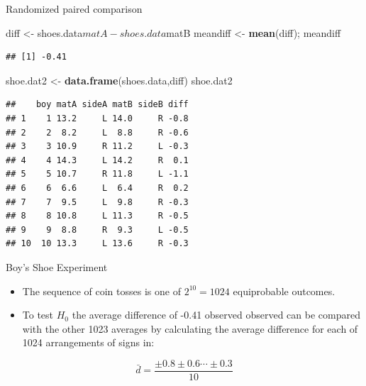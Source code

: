 \documentclass[9pt,ignorenonframetext,]{beamer}
\newenvironment{Shaded}{\begin{snugshade}}{\end{snugshade}}
\newcommand{\KeywordTok}[1]{\textcolor[rgb]{0.13,0.29,0.53}{\textbf{{#1}}}}
\newcommand{\StringTok}[1]{\textcolor[rgb]{0.31,0.60,0.02}{{#1}}}
\newcommand{\NormalTok}[1]{{#1}}
\begin{document}
\begin{frame}[fragile]{Randomized paired comparison}

\begin{Shaded}
\begin{Highlighting}[]
\NormalTok{diff <-}\StringTok{ }\NormalTok{shoes.data$matA-shoes.data$matB}
\NormalTok{meandiff <-}\StringTok{ }\KeywordTok{mean}\NormalTok{(diff); meandiff}
\end{Highlighting}
\end{Shaded}

\begin{verbatim}
## [1] -0.41
\end{verbatim}

\begin{Shaded}
\begin{Highlighting}[]
\NormalTok{shoe.dat2 <-}\StringTok{ }\KeywordTok{data.frame}\NormalTok{(shoes.data,diff)}
\NormalTok{shoe.dat2}
\end{Highlighting}
\end{Shaded}

\begin{verbatim}
##    boy matA sideA matB sideB diff
## 1    1 13.2     L 14.0     R -0.8
## 2    2  8.2     L  8.8     R -0.6
## 3    3 10.9     R 11.2     L -0.3
## 4    4 14.3     L 14.2     R  0.1
## 5    5 10.7     R 11.8     L -1.1
## 6    6  6.6     L  6.4     R  0.2
## 7    7  9.5     L  9.8     R -0.3
## 8    8 10.8     L 11.3     R -0.5
## 9    9  8.8     R  9.3     L -0.5
## 10  10 13.3     L 13.6     R -0.3
\end{verbatim}

\end{frame}

\begin{frame}{Boy's Shoe Experiment}

\begin{itemize}
\item
  The sequence of coin tosses is one of \(2^{10}=1024\) equiprobable
  outcomes.
\item
  To test \(H_0\) the average difference of -0.41 observed observed can
  be compared with the other 1023 averages by calculating the average
  difference for each of 1024 arrangements of signs in:
\end{itemize}

\[{\bar d} = \frac{\pm 0.8 \pm0.6 \cdots \pm 0.3}{10}\]

\end{frame}
\end{document}
